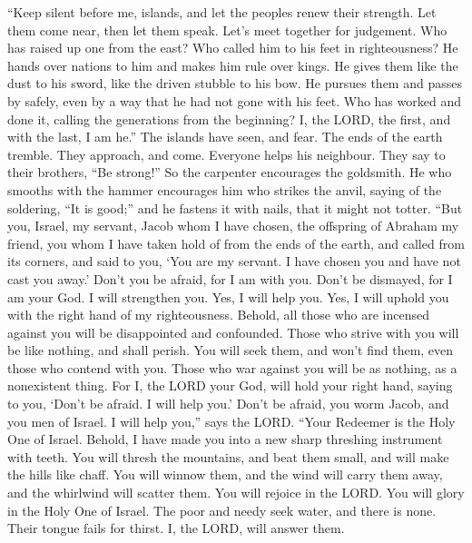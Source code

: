  ``Keep silent before me, islands, and let the peoples
renew their strength. Let them come near, then let them speak. Let's
meet together for judgement.  Who has raised up one from
the east? Who called him to his feet in righteousness? He hands over
nations to him and makes him rule over kings. He gives them like the
dust to his sword, like the driven stubble to his bow.  He
pursues them and passes by safely, even by a way that he had not gone
with his feet.  Who has worked and done it, calling the
generations from the beginning? I, the LORD, the first, and with the
last, I am he.''  The islands have seen, and fear. The
ends of the earth tremble. They approach, and come. 
Everyone helps his neighbour. They say to their brothers, ``Be strong!''
 So the carpenter encourages the goldsmith. He who smooths
with the hammer encourages him who strikes the anvil, saying of the
soldering, ``It is good;'' and he fastens it with nails, that it might
not totter.  ``But you, Israel, my servant, Jacob whom I
have chosen, the offspring of Abraham my friend,  you whom
I have taken hold of from the ends of the earth, and called from its
corners, and said to you, `You are my servant. I have chosen you and
have not cast you away.'  Don't you be afraid, for I am
with you. Don't be dismayed, for I am your God. I will strengthen you.
Yes, I will help you. Yes, I will uphold you with the right hand of my
righteousness.  Behold, all those who are incensed
against you will be disappointed and confounded. Those who strive with
you will be like nothing, and shall perish.  You will
seek them, and won't find them, even those who contend with you. Those
who war against you will be as nothing, as a nonexistent thing.
 For I, the LORD your God, will hold your right hand,
saying to you, `Don't be afraid. I will help you.'  Don't
be afraid, you worm Jacob, and you men of Israel. I will help you,''
says the LORD. ``Your Redeemer is the Holy One of Israel.
 Behold, I have made you into a new sharp threshing
instrument with teeth. You will thresh the mountains, and beat them
small, and will make the hills like chaff.  You will
winnow them, and the wind will carry them away, and the whirlwind will
scatter them. You will rejoice in the LORD. You will glory in the Holy
One of Israel.  The poor and needy seek water, and there
is none. Their tongue fails for thirst. I, the LORD, will answer them.
